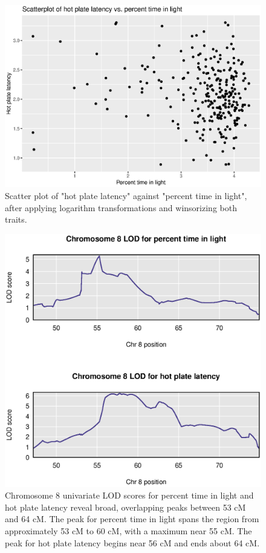 \documentclass[12pt,twoside, lineno]{gsajnl}
\begin{document}
\begin{figure}
\includegraphics[width = \textwidth]{../Rmd/scatter.eps}
\caption{Scatter plot of "hot plate latency" against "percent time in light", after applying logarithm transformations and winsorizing both traits.}
\label{fig:scatter}
\end{figure}


\begin{figure}
\includegraphics[width = \textwidth]{../Rmd/chr8-lods.eps}
\caption{Chromosome 8 univariate LOD scores for percent time in light and hot plate latency reveal broad, overlapping peaks between 53 cM and 64 cM. The peak for percent time in light spans the region from approximately 53 cM to 60 cM, with a maximum near 55 cM. The peak for hot plate latency begins near 56 cM and ends about 64 cM.}
\label{fig:chr8-lod}
\end{figure}
\end{document}
